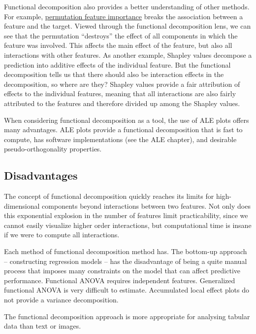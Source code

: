 \documentclass[
  12pt,
]{krantz}
\begin{document}
Functional decomposition also provides a better understanding of other methods.
For example, \protect\hyperlink{feature-importance}{permutation feature importance} breaks the association between a feature and the target.
Viewed through the functional decomposition lens, we can see that the permutation ``destroys'' the effect of all components in which the feature was involved.
This affects the main effect of the feature, but also all interactions with other features.
As another example, Shapley values decompose a prediction into additive effects of the individual feature.
But the functional decomposition tells us that there should also be interaction effects in the decomposition, so where are they?
Shapley values provide a fair attribution of effects to the individual features, meaning that all interactions are also fairly attributed to the features and therefore divided up among the Shapley values.

When considering functional decomposition as a tool, the use of ALE plots offers many advantages.
ALE plots provide a functional decomposition that is fast to compute, has software implementations (see the ALE chapter), and desirable pseudo-orthogonality properties.

\hypertarget{disadvantages-8}{%
\subsection{Disadvantages}\label{disadvantages-8}}

The concept of functional decomposition quickly reaches its limits for high-dimensional components beyond interactions between two features.
Not only does this exponential explosion in the number of features limit practicability, since we cannot easily visualize higher order interactions, but computational time is insane if we were to compute all interactions.

Each method of functional decomposition method has.
The bottom-up approach -- constructing regression models -- has the disadvantage of being a quite manual process that imposes many constraints on the model that can affect predictive performance.
Functional ANOVA requires independent features.
Generalized functional ANOVA is very difficult to estimate.
Accumulated local effect plots do not provide a variance decomposition.

The functional decomposition approach is more appropriate for analysing tabular data than text or images.

\newpage
\end{document}
